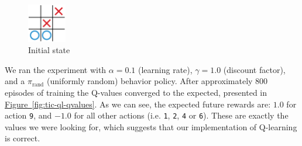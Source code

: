 \documentclass{article}
\begin{document}

\begin{figure}[!h]
    \centering
    \includegraphics[width=0.15\textwidth]{figures/tic_ql_tab_current.pdf}
    \caption{Initial state}
    \label{fig:tic-ql-tab-cur}
\end{figure}

We ran the experiment with $\alpha = 0.1$ (learning rate), $\gamma=1.0$ (discount factor), and a
$\pi_{\textrm{rand}}$ (uniformly random) behavior policy. After approximately 800 episodes of
training the Q-values converged to the expected, presented in \hyperref[fig:tic-ql-qvalues]
{Figure~\ref*{fig:tic-ql-qvalues}}. As we can see, the expected future rewards are: $1.0$ for action
\texttt{9}, and $-1.0$ for all other actions (i.e. \texttt{1}, \texttt{2}, \texttt{4} or
\texttt{6}). These are exactly the values we were looking for, which suggests that our
implementation of Q-learning is correct.


\end{document}
